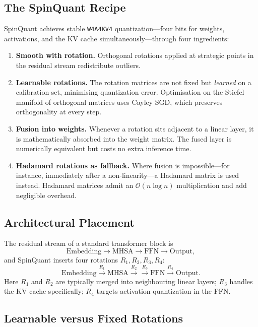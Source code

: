 \documentclass[11pt,a4paper]{article}
\theoremstyle{definition}
\theoremstyle{remark}
\theoremstyle{plain}
\newcommand{\bigO}{\mathcal{O}}
\begin{document}
\subsection{The SpinQuant Recipe}

SpinQuant achieves stable \texttt{W4A4KV4} quantization---four bits for
weights, activations, and the KV cache simultaneously---through four
ingredients:

\begin{enumerate}[leftmargin=1.8em, itemsep=2pt]
  \item \textbf{Smooth with rotation.} Orthogonal rotations applied at
        strategic points in the residual stream redistribute outliers.
  \item \textbf{Learnable rotations.} The rotation matrices are not fixed
        but \emph{learned} on a calibration set, minimising quantization
        error. Optimisation on the Stiefel manifold of orthogonal matrices
        uses Cayley SGD, which preserves orthogonality at every step.
  \item \textbf{Fusion into weights.} Whenever a rotation sits adjacent to
        a linear layer, it is mathematically absorbed into the weight
        matrix. The fused layer is numerically equivalent but costs no
        extra inference time.
  \item \textbf{Hadamard rotations as fallback.} Where fusion is
        impossible---for instance, immediately after a non-linearity---a
        Hadamard matrix is used instead. Hadamard matrices admit an
        $\bigO(n \log n)$ multiplication and add negligible overhead.
\end{enumerate}

\subsection{Architectural Placement}

The residual stream of a standard transformer block is
\[
  \text{Embedding} \to \text{MHSA} \to \text{FFN} \to \text{Output},
\]
and SpinQuant inserts four rotations $R_1, R_2, R_3, R_4$:
\[
  \text{Embedding} \xrightarrow{R_1} \text{MHSA} \xrightarrow{R_2} \xrightarrow{R_3} \text{FFN} \xrightarrow{R_4} \text{Output}.
\]
Here $R_1$ and $R_2$ are typically merged into neighbouring linear layers;
$R_3$ handles the KV cache specifically; $R_4$ targets activation
quantization in the FFN.

\subsection{Learnable versus Fixed Rotations}
\end{document}
